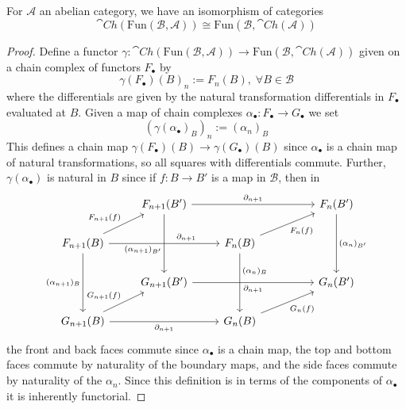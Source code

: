 \begin{lem}[label=lem:funcChain]
    For $\mathcal{A}$ an abelian category, we have an isomorphism of categories
    \begin{equation}\label{eq:ChainFunc}
        \cat{Ch}(\text{Fun}(\mathcal{B},\mathcal{A}))\cong \text{Fun}(\mathcal{B},\cat{Ch}(\mathcal{A}))
    \end{equation}
\end{lem}
\begin{proof}
    Define a functor $\gamma:\cat{Ch}(\text{Fun}(\mathcal{B},\mathcal{A}))\rightarrow \text{Fun}(\mathcal{B},\cat{Ch}(\mathcal{A}))$ given on a chain complex of functors $F_\bullet$ by
    \begin{equation*}
        \gamma(F_\bullet)(B)_n := F_n(B),\;\forall B \in \mathcal{B}
    \end{equation*}
    where the differentials are given by the natural transformation differentials in $F_\bullet$ evaluated at $B$. Given a map of chain complexes $\alpha_\bullet:F_\bullet\rightarrow G_\bullet$ we set
    \begin{equation*}
        (\gamma(\alpha_\bullet)_B)_n := (\alpha_n)_B
    \end{equation*}
    This defines a chain map $\gamma(F_\bullet)(B)\rightarrow \gamma(G_\bullet)(B)$ since $\alpha_\bullet$ is a chain map of natural transformations, so all squares with differentials commute. Further, $\gamma(\alpha_\bullet)$ is natural in $B$ since if $f:B\rightarrow B'$ is a map in $\mathcal{B}$, then in
    \[\begin{tikzcd}
    	& {F_{n+1}(B')} &&& {F_n(B')} \\
    	{F_{n+1}(B)} && {F_n(B)} \\
    	& {G_{n+1}(B')} &&& {G_n(B')} \\
    	{G_{n+1}(B)} && {G_n(B)}
    	\arrow["{\partial_{n+1}}"{pos=0.7}, from=2-1, to=2-3]
    	\arrow["{(\alpha_{n+1})_B}"', from=2-1, to=4-1]
    	\arrow["{\partial_{n+1}}"', from=4-1, to=4-3]
    	\arrow["{(\alpha_n)_B}"{pos=0.3}, from=2-3, to=4-3]
    	\arrow["{F_{n+1}(f)}", from=2-1, to=1-2]
    	\arrow["{F_n(f)}"', from=2-3, to=1-5]
    	\arrow["{\partial_{n+1}}", from=1-2, to=1-5]
    	\arrow["{(\alpha_n)_{B'}}", from=1-5, to=3-5]
    	\arrow["{G_n(f)}"', from=4-3, to=3-5]
    	\arrow["{G_{n+1}(f)}", from=4-1, to=3-2]
    	\arrow["{(\alpha_{n+1})_{B'}}"'{pos=0.6}, from=1-2, to=3-2]
    	\arrow["{\partial_{n+1}}"', from=3-2, to=3-5]
    \end{tikzcd}\]
    the front and back faces commute since $\alpha_\bullet$ is a chain map, the top and bottom faces commute by naturality of the boundary maps, and the side faces commute by naturality of the $\alpha_n$. Since this definition is in terms of the components of $\alpha_\bullet$ it is inherently functorial. 


\end{proof}
